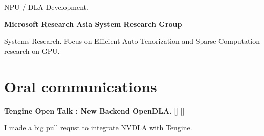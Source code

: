 \documentclass[a4paper,10pt]{article}
\begin{document}
\begin{adjustbox}{valign=t}
\begin{minipage}{0.6\textwidth}
\begin{description}
	NPU / DLA Development.\\
		
\end{description}

\begin{description}
	\raggedright
	\item[\normalfont \textcolor{ColorOne}{April. 2022 - Oct. 2023.}] 
		\textbf{Microsoft Research Asia System Research Group}\\ \medskip
		
		Systems Research. Focus on Efficient Auto-Tenorization and Sparse Computation research on GPU.\\
		
	\end{description}
	
\section*{Oral communications}
\begin{description}
	\raggedright
	\item [\normalfont \textcolor{ColorOne}{Sep. 23th, 2021.}] 
	\textbf{Tengine Open Talk : New Backend OpenDLA.} [] []

	I made a big pull requst  to integrate NVDLA with Tengine.
\end{description}


\MySkip

\LastUpdate
\end{minipage}
\end{adjustbox}
\end{document}
